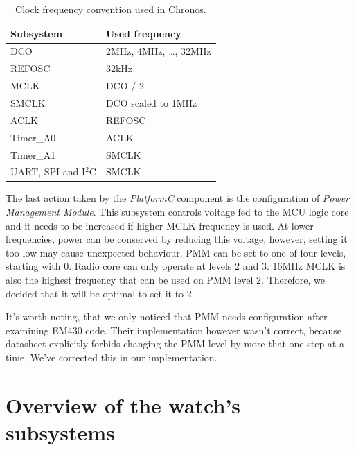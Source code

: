 \begin{table}
  \centering
  \begin{tabular}{ | l | l | }
    \hline
    Subsystem & Used frequency \\
    \hline
    DCO & 2MHz, 4MHz, \ldots, 32MHz \\
    REFOSC & 32kHz \\
    MCLK & DCO / 2 \\
    SMCLK & DCO scaled to 1MHz  \\
    ACLK & REFOSC \\
    Timer\_A0 & ACLK \\
    Timer\_A1 & SMCLK \\
    UART, SPI and I$^2$C & SMCLK \\
    \hline
  \end{tabular}
  \caption{Clock frequency convention used in Chronos.}
  \label{fig:clock_speeds}
\end{table}

The last action taken by the \emph{PlatformC} component is the configuration of \emph{Power Management Module}. This subsystem controls voltage fed to the MCU logic core and it needs to be increased if higher MCLK frequency is used. At lower frequencies, power can be conserved by reducing this voltage, however, setting it too low may cause unexpected behaviour. PMM can be set to one of four levels, starting with 0. Radio core can only operate at levels 2 and 3. 16MHz MCLK is also the highest frequency that can be used on PMM level 2. Therefore, we decided that it will be optimal to set it to 2.

It's worth noting, that we only noticed that PMM needs configuration after examining EM430 code. Their implementation however wasn't correct, because datasheet explicitly forbids changing the PMM level by more that one step at a time. We've corrected this in our implementation.

\section{Overview of the watch's subsystems}


